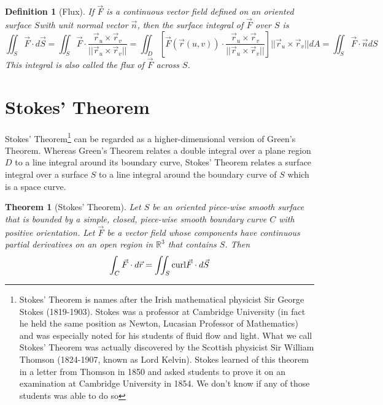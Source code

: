 \documentclass[10pt]{report}
\newtheorem{thm2}{Theorem}[section]
\newtheorem{def2}{Definition}[section]
\newcommand{\curl}{\textup{curl}}
\begin{document}
\begin{def2}[Flux]
If $\vec{F}$ is a continuous vector field defined on an oriented surface $S$with unit normal vector $\vec{n}$, then the surface integral of $\vec{F}$ over $S$ is
$$\iint_S \vec{F}\cdot d\vec{S} = \iint_S\vec{F}\cdot\frac{\vec{r}_u\times\vec{r}_v}{||\vec{r}_u\times\vec{r}_v||} = \iint_D\left[ \vec{F}(\vec{r}(u,v))\cdot \frac{\vec{r}_u\times\vec{r}_v}{||\vec{r}_u\times\vec{r}_v||}\right]||\vec{r}_u\times\vec{r}_v||dA = \iint_S \vec{F}\cdot \vec{n}dS$$
This integral is also called the flux of $\vec{F}$ across $S$.
\end{def2}
\section{Stokes' Theorem}
Stokes' Theorem\footnote{Stokes' Theorem is names after the Irish mathematical physicist Sir George Stokes (1819-1903). Stokes was a professor at Cambridge University (in fact he held the same position as Newton, Lucasian Professor of Mathematics) and was especially noted for his students of fluid flow and light. What we call Stokes' Theorem was actually discovered by the Scottish physicist Sir William Thomson (1824-1907, known as Lord Kelvin). Stokes learned of this theorem in a letter from Thomson in 1850 and asked students to prove it on an examination at Cambridge University in 1854. We don't know if any of those students was able to do so} can be regarded as a higher-dimensional version of Green's Theorem. Whereas Green's Theorem relates a double integral over a plane region $D$  to a line integral around its boundary curve, Stokes' Theorem relates a surface integral over a surface $S$ to a line integral around the boundary curve of $S$ which is a space curve.
\begin{thm2}[Stokes' Theorem]
Let $S$ be an oriented piece-wise smooth surface that is bounded by a simple, closed, piece-wise smooth boundary curve $C$ with positive orientation. Let $\vec{F}$ be a vector field whose components have continuous partial derivatives on an open region in $\mathbb{R}^3$ that contains $S$. Then
$$\int_C\vec{F}\cdot d\vec{r} = \iint_S\curl\vec{F}\cdot d\vec{S}$$
\end{thm2}
\end{document}
